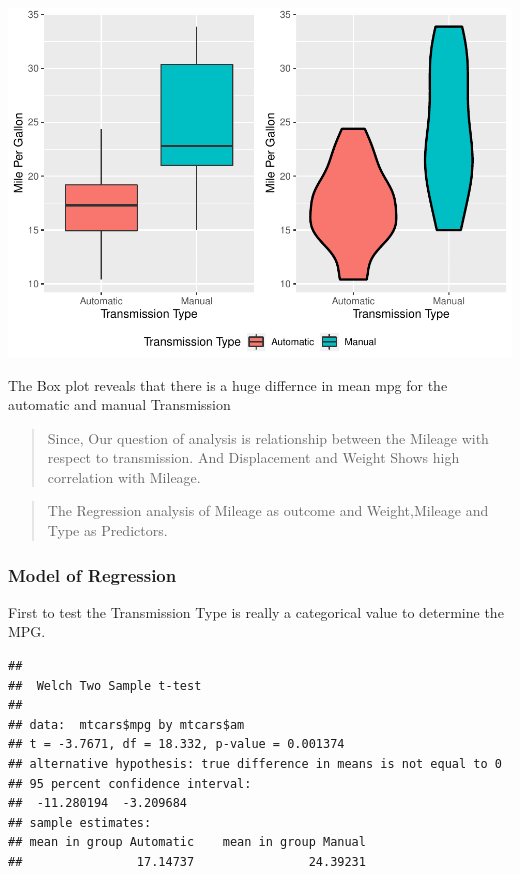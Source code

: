 \documentclass[
]{article}
\newenvironment{Shaded}{\begin{snugshade}}{\end{snugshade}}
\newcommand{\DataTypeTok}[1]{\textcolor[rgb]{0.13,0.29,0.53}{#1}}
\newcommand{\FloatTok}[1]{\textcolor[rgb]{0.00,0.00,0.81}{#1}}
\newcommand{\KeywordTok}[1]{\textcolor[rgb]{0.13,0.29,0.53}{\textbf{#1}}}
\newcommand{\NormalTok}[1]{#1}
\newcommand{\OperatorTok}[1]{\textcolor[rgb]{0.81,0.36,0.00}{\textbf{#1}}}
\begin{document}
\includegraphics{MotorTrendAnalysis_files/figure-latex/unnamed-chunk-1-1.pdf}

The Box plot reveals that there is a huge differnce in mean mpg for the
automatic and manual Transmission

\begin{quote}
Since, Our question of analysis is relationship between the Mileage with
respect to transmission. And Displacement and Weight Shows high
correlation with Mileage.
\end{quote}

\begin{quote}
The Regression analysis of Mileage as outcome and Weight,Mileage and
Type as Predictors.
\end{quote}

\hypertarget{model-of-regression}{%
\subsubsection{Model of Regression}\label{model-of-regression}}

First to test the Transmission Type is really a categorical value to
determine the MPG.

\begin{Shaded}
\end{Shaded}

\begin{verbatim}
## 
##  Welch Two Sample t-test
## 
## data:  mtcars$mpg by mtcars$am
## t = -3.7671, df = 18.332, p-value = 0.001374
## alternative hypothesis: true difference in means is not equal to 0
## 95 percent confidence interval:
##  -11.280194  -3.209684
## sample estimates:
## mean in group Automatic    mean in group Manual 
##                17.14737                24.39231
\end{verbatim}
\end{document}
